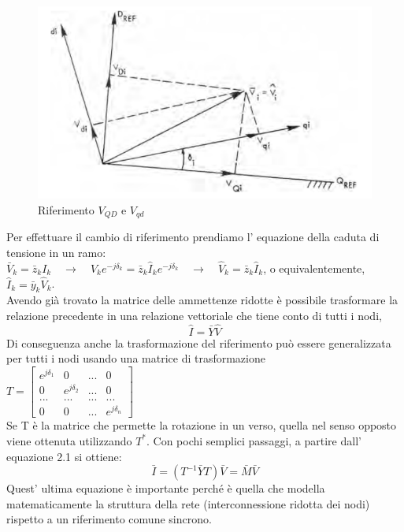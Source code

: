 \documentclass[Lau,noexaminfo]{sapthesis}
\begin{document}
	\begin{figure}
		\centering
		\includegraphics[height=0.3\textheight]{cambio_coordinate}
		\caption{Riferimento $V_{QD}$ e $V_{qd}$}
	\end{figure}
	Per effettuare il cambio di riferimento prendiamo l' equazione della caduta di tensione in un ramo:\\
	$\bar{V}_k=\bar{z}_kI_k \quad \rightarrow \quad \hat{V}_ke^{-j\delta_k}=\bar{z}_k\hat{I}_ke^{-j\delta_k} \quad \rightarrow \quad \hat{V}_k=\bar{z}_k\hat{I}_k$, o equivalentemente,\\$\hat{I}_k=\bar{y}_k\hat{V}_k$.\\
	Avendo già trovato la matrice delle ammettenze ridotte è possibile trasformare la relazione precedente in una relazione vettoriale che tiene conto di tutti i nodi,
	\begin{equation}
		\hat{I}=\bar{Y}\hat{V}
	\end{equation}
	Di conseguenza anche la trasformazione del riferimento può essere generalizzata per tutti i nodi usando una matrice di trasformazione\\
	$T=\begin{bmatrix}
	e^{j\delta_1} & 0 & ... & 0\\
	0 & e^{j\delta_2} & ... & 0\\
	... & ...  & ... & ...\\
	0 & 0 & ... & e^{j\delta_n}
	\end{bmatrix}$\\
	Se T è la matrice che permette la rotazione in un verso, quella nel senso opposto viene ottenuta utilizzando $T^*$. Con pochi semplici passaggi, a partire dall' equazione 2.1 si ottiene:\\
	\begin{equation}
	\bar{I}=(T^{-1}\bar{Y}T)\bar{V}=\bar{M}\bar{V}
	\end{equation}
	Quest' ultima equazione è importante perché è quella che modella matematicamente la struttura della rete (interconnessione ridotta dei nodi) rispetto a un riferimento comune sincrono.\newpage
\end{document}
